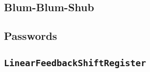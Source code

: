 
\subsection{Blum-Blum-Shub}
\subsection{Passwords}
\subsection{\texttt{LinearFeedbackShiftRegister}}
